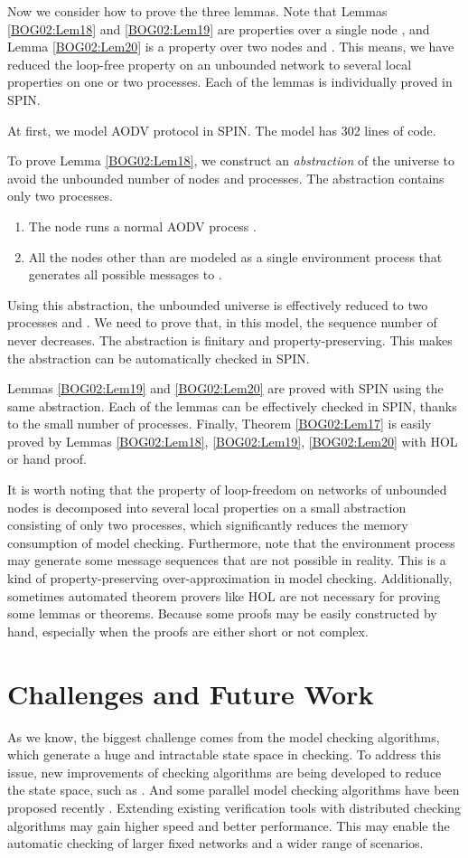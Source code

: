 \documentclass[a4paper,10pt,twocolumn]{article}
\begin{document}
Now we consider how to prove the three lemmas. Note that Lemmas \ref{BOG02:Lem18} and \ref{BOG02:Lem19} are properties over a single node , and Lemma \ref{BOG02:Lem20} is a property over two nodes  and . This means, we have reduced the loop-free property on an unbounded network to several local properties on one or two processes. Each of the lemmas is individually proved in SPIN.

At first, we model AODV protocol in SPIN. The model has 302 lines of code.

To prove Lemma \ref{BOG02:Lem18}, we construct an \emph{abstraction} of the universe to avoid the unbounded number of nodes and processes. The abstraction contains only two processes.
\begin{enumerate}
  \item The node  runs a normal AODV process .
  \item All the nodes other than  are modeled as a single environment process  that generates all possible messages to .
\end{enumerate}
Using this abstraction, the unbounded universe is effectively reduced to two processes  and . We need to prove that, in this model, the sequence number of  never decreases. The abstraction is finitary and property-preserving. This makes the abstraction can be automatically checked in SPIN.

Lemmas \ref{BOG02:Lem19} and \ref{BOG02:Lem20} are proved with SPIN using the same abstraction. Each of the lemmas can be effectively checked in SPIN, thanks to the small number of processes. Finally, Theorem \ref{BOG02:Lem17} is easily proved by Lemmas \ref{BOG02:Lem18}, \ref{BOG02:Lem19}, \ref{BOG02:Lem20} with HOL or hand proof.

It is worth noting that the property of loop-freedom on networks of unbounded nodes is decomposed into several local properties on a small abstraction consisting of only two processes, which significantly reduces the memory consumption of model checking. Furthermore, note that the environment process  may generate some message sequences that are not possible in reality. This is a kind of property-preserving over-approximation in model checking. Additionally, sometimes automated theorem provers like HOL are not necessary for proving some lemmas or theorems. Because some proofs may be easily constructed by hand, especially when the proofs are either short or not complex.

\section{Challenges and Future Work}
\label{Sec:future}
As we know, the biggest challenge comes from the model checking algorithms, which generate a huge and intractable state space in checking. To address this issue, new improvements of checking algorithms are being developed to reduce the state space, such as \cite{CM10b}. And some parallel model checking algorithms have been proposed recently \cite{BHV00,BBS01}. Extending existing verification tools with distributed checking algorithms may gain higher speed and better performance. This may enable the automatic checking of larger fixed networks and a wider range of scenarios.
\end{document}
